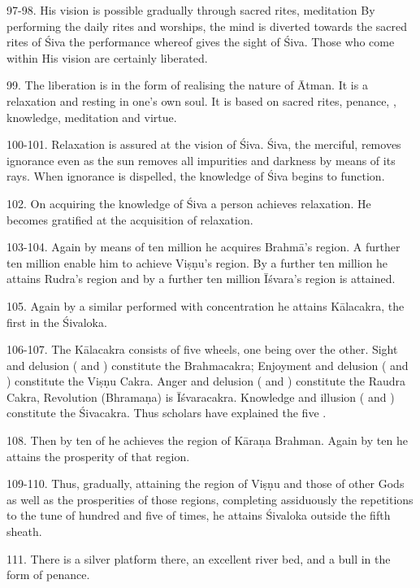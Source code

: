 97-98. His vision is possible gradually through sacred rites, meditation \etc
By performing the daily rites and worships, the mind is diverted towards
the sacred rites of Śiva the performance whereof gives the sight of Śiva. Those
who come within His vision are certainly liberated.

99. The liberation is in the form of realising the nature of Ātman. It is
a relaxation and resting in one’s own soul. It is based on sacred rites, penance,
, knowledge, meditation and virtue.

100-101. Relaxation is assured at the vision of Śiva. Śiva, the merciful,
removes ignorance even as the sun removes all impurities and darkness by means
of its rays. When ignorance is dispelled, the knowledge of Śiva begins to
function.

102. On acquiring the knowledge of Śiva a person achieves relaxation. He becomes
gratified at the acquisition of relaxation.

103-104. Again by means of ten million  he acquires Brahmā’s region.
A further ten million  enable him to achieve Viṣṇu’s region. By
a further ten million  he attains Rudra’s region and by a further ten
million  Īśvara’s region is attained.

105. Again by a similar  performed with concentration he attains
Kālacakra, the first in the Śivaloka.

106-107. The Kālacakra consists of five wheels, one being over the other. Sight
and delusion ( and ) constitute the Brahmacakra; Enjoyment
and delusion ( and ) constitute the Viṣṇu Cakra. Anger and
delusion ( and ) constitute the Raudra Cakra, Revolution
(Bhramaṇa) is Īśvaracakra. Knowledge and illusion ( and )
constitute the Śivacakra. Thus scholars have explained the five .

108. Then by ten  of  he achieves the region of Kāraṇa
Brahman. Again by ten  he attains the prosperity of that region.

109-110. Thus, gradually, attaining the region of Viṣṇu and those of other Gods
as well as the prosperities of those regions, completing assiduously
the repetitions to the tune of hundred and five  of times, he attains
Śivaloka outside the fifth sheath.

111. There is a silver platform there, an excellent river bed, and a bull in
the form of penance.

